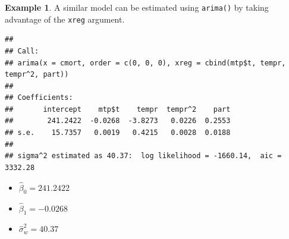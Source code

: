 \documentclass[
]{book}
\newenvironment{Shaded}{\begin{snugshade}}{\end{snugshade}}
\newcommand{\AttributeTok}[1]{\textcolor[rgb]{0.77,0.63,0.00}{#1}}
\newcommand{\DecValTok}[1]{\textcolor[rgb]{0.00,0.00,0.81}{#1}}
\newcommand{\FunctionTok}[1]{\textcolor[rgb]{0.00,0.00,0.00}{#1}}
\newcommand{\NormalTok}[1]{#1}
\newcommand{\OtherTok}[1]{\textcolor[rgb]{0.56,0.35,0.01}{#1}}
\newcommand{\SpecialCharTok}[1]{\textcolor[rgb]{0.00,0.00,0.00}{#1}}
\newcommand{\StringTok}[1]{\textcolor[rgb]{0.31,0.60,0.02}{#1}}
\theoremstyle{definition}
\theoremstyle{definition}
\newtheorem{example}{Example}[chapter]
\theoremstyle{definition}
\theoremstyle{definition}
\theoremstyle{remark}
\begin{document}
\begin{example}
A similar model can be estimated using \texttt{arima()} by taking advantage of the \texttt{xreg} argument.

\begin{Shaded}
\end{Shaded}

\begin{verbatim}
## 
## Call:
## arima(x = cmort, order = c(0, 0, 0), xreg = cbind(mtp$t, tempr, tempr^2, part))
## 
## Coefficients:
##       intercept    mtp$t    tempr  tempr^2    part
##        241.2422  -0.0268  -3.8273   0.0226  0.2553
## s.e.    15.7357   0.0019   0.4215   0.0028  0.0188
## 
## sigma^2 estimated as 40.37:  log likelihood = -1660.14,  aic = 3332.28
\end{verbatim}

\begin{itemize}
\item
  \(\hat \beta_0=241.2422\)
\item
  \(\hat \beta_1=-0.0268\)
\item
  \(\hat \sigma^2_w=40.37\)
\end{itemize}

\begin{Shaded}
\end{Shaded}


\end{example}
\end{document}
